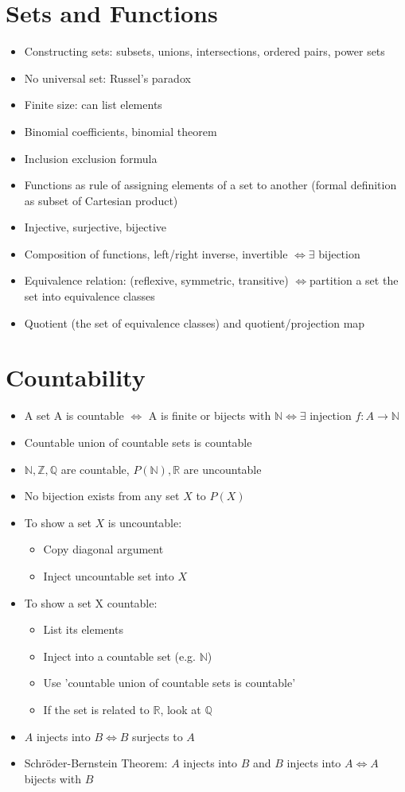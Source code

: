 \documentclass[12pt]{article}
\begin{document}
\section{Sets and Functions}
\begin{itemize}
\item Constructing sets: subsets, unions, intersections, ordered pairs,
power sets
\item No universal set: Russel's paradox
\item Finite size: can list elements
\item Binomial coefficients, binomial theorem
\item Inclusion exclusion formula
\item Functions as rule of assigning elements of a set to another (formal
definition as subset of Cartesian product)
\item Injective, surjective, bijective
\item Composition of functions, left/right inverse, invertible $\iff\exists$
bijection
\item Equivalence relation: (reflexive, symmetric, transitive) $\iff$partition a set
the set into equivalence classes
\item Quotient (the set of equivalence classes) and quotient/projection map
\end{itemize}

\section{Countability}
\begin{itemize}
\item A set A is countable $\iff$ A is finite or bijects with $\mathbb{N}\iff\exists$
injection $f:A\to\mathbb{N}$
\item Countable union of countable sets is countable
\item $\mathbb{N},\mathbb{Z},\mathbb{Q}$ are countable, $P(\mathbb{N}),\mathbb{R}$
are uncountable
\item No bijection exists from any set $X$ to $P(X)$
\item To show a set $X$ is uncountable:
\begin{itemize}
\item Copy diagonal argument
\item Inject uncountable set into $X$
\end{itemize}
\item To show a set X countable:
\begin{itemize}
\item List its elements
\item Inject into a countable set (e.g. $\mathbb{N}$)
\item Use 'countable union of countable sets is countable'
\item If the set is related to $\mathbb{R}$, look at $\mathbb{Q}$
\end{itemize}
\item $A$ injects into $B\iff B$ surjects to $A$
\item Schröder-Bernstein Theorem: $A$ injects into $B$ and $B$ injects
into $A\iff A$ bijects with $B$
\end{itemize}
\end{document}
